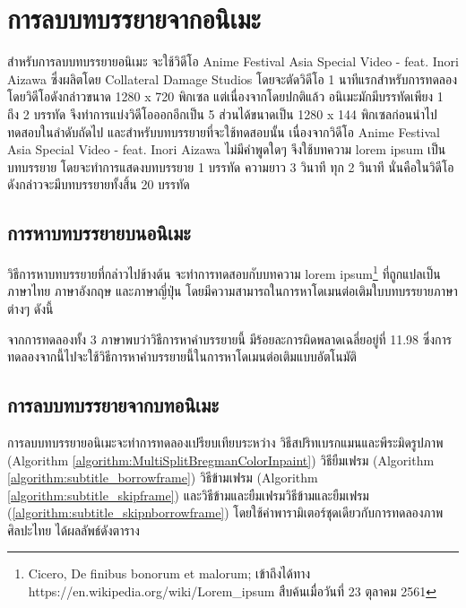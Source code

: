 \section{การลบบทบรรยายจากอนิเมะ}
\hspace{1cm} สำหรับการลบบทบรรยายอนิเมะ จะใช้วิดีโอ Anime Festival Asia Special Video - feat. Inori Aizawa ซึ่งผลิตโดย Collateral Damage Studios โดยจะตัดวิดีโอ 1 นาทีแรกสำหรับการทดลอง โดยวิดีโอดังกล่าวขนาด 1280 x 720 พิกเซล แต่เนื่องจากโดยปกติแล้ว อนิเมะมักมีบรรทัดเพียง 1 ถึง 2 บรรทัด จึงทำการแบ่งวิดีโอออกอีกเป็น 5 ส่วนได้ขนาดเป็น 1280 x 144 พิกเซลก่อนนำไปทดสอบในลำดับถัดไป และสำหรับบทบรรยายที่จะใช้ทดสอบนั้น เนื่องจากวิดีโอ Anime Festival Asia Special Video - feat. Inori Aizawa ไม่มีคำพูดใดๆ จึงใช้บทความ lorem ipsum เป็นบทบรรยาย โดยจะทำการแสดงบทบรรยาย 1 บรรทัด ความยาว 3 วินาที ทุก 2 วินาที นั่นคือในวิดีโอดังกล่าวจะมีบทบรรยายทั้งสิ้น 20 บรรทัด	
	


\subsection{การหาบทบรรยายบนอนิเมะ}	
    
\hspace{1cm} วิธีการหาบทบรรยายที่กล่าวไปข้างต้น จะทำการทดสอบกับบทความ lorem ipsum\footnote{Cicero, De finibus bonorum et malorum; เข้าถึงได้ทาง https://en.wikipedia.org/wiki/Lorem\_ipsum สืบค้นเมื่อวันที่ 23 ตุลาคม 2561} ที่ถูกแปลเป็นภาษาไทย ภาษาอังกฤษ และภาษาญี่ปุ่น โดยมีความสามารถในการหาโดเมนต่อเติมใบบทบรรยายภาษาต่างๆ ดังนี้


	

\hspace{1cm} จากการทดลองทั้ง  3 ภาษาพบว่าวิธีการหาคำบรรยายนี้ มีร้อยละการผิดพลาดเฉลี่ยอยู่ที่ 11.98 ซึ่งการทดลองจากนี้ไปจะใช้วิธีการหาคำบรรยายนี้ในการหาโดเมนต่อเติมแบบอัตโนมัติ

\subsection{การลบบทบรรยายจากบทอนิเมะ}

\hspace{1cm} การลบบทบรรยายอนิเมะจะทำการทดลองเปรียบเทียบระหว่าง วิธีสปริทเบรกแมนและพีระมิดรูปภาพ (Algorithm \ref{algorithm:MultiSplitBregmanColorInpaint}) วิธียืมเฟรม (Algorithm \ref{algorithm:subtitle_borrowframe}) วิธีข้ามเฟรม (Algorithm \ref{algorithm:subtitle_skipframe}) และวิธีข้ามและยืมเฟรมวิธีข้ามและยืมเฟรม (\ref{algorithm:subtitle_skipnborrowframe}) โดยใช้ค่าพารามิเตอร์ชุดเดียวกับการทดลองภาพศิลปะไทย ได้ผลลัพธ์ดังตาราง 

